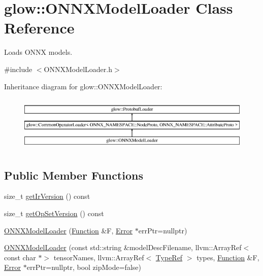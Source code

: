 \hypertarget{classglow_1_1_o_n_n_x_model_loader}{}\section{glow\+:\+:O\+N\+N\+X\+Model\+Loader Class Reference}
\label{classglow_1_1_o_n_n_x_model_loader}


Loads O\+N\+NX models.  




{\ttfamily \#include $<$O\+N\+N\+X\+Model\+Loader.\+h$>$}

Inheritance diagram for glow\+:\+:O\+N\+N\+X\+Model\+Loader\+:\begin{figure}[H]
\begin{center}
\leavevmode
\includegraphics[height=2.714055cm]{classglow_1_1_o_n_n_x_model_loader}
\end{center}
\end{figure}
\subsection*{Public Member Functions}
\begin{DoxyCompactItemize}
\item 
size\+\_\+t \hyperlink{classglow_1_1_o_n_n_x_model_loader_a3c8adfddf50b79e3c62c4482a5c7396f}{get\+Ir\+Version} () const
\item 
size\+\_\+t \hyperlink{classglow_1_1_o_n_n_x_model_loader_ad79bf9d6dce0929b7ac160370dde4016}{get\+Op\+Set\+Version} () const
\item 
\hyperlink{classglow_1_1_o_n_n_x_model_loader_ac83cee4acc760b654ff5df058476d0a7}{O\+N\+N\+X\+Model\+Loader} (\hyperlink{classglow_1_1_function}{Function} \&F, \hyperlink{namespaceglow_afdb176c3a672ef66db0ecfc19a8d39bf}{Error} $\ast$err\+Ptr=nullptr)
\item 
\hyperlink{classglow_1_1_o_n_n_x_model_loader_a610dc94fa573669e30035e80c020f5ab}{O\+N\+N\+X\+Model\+Loader} (const std\+::string \&model\+Desc\+Filename, llvm\+::\+Array\+Ref$<$ const char $\ast$$>$ tensor\+Names, llvm\+::\+Array\+Ref$<$ \hyperlink{structglow_1_1_type}{Type\+Ref} $>$ types, \hyperlink{classglow_1_1_function}{Function} \&F, \hyperlink{namespaceglow_afdb176c3a672ef66db0ecfc19a8d39bf}{Error} $\ast$err\+Ptr=nullptr, bool zip\+Mode=false)
\end{DoxyCompactItemize}
